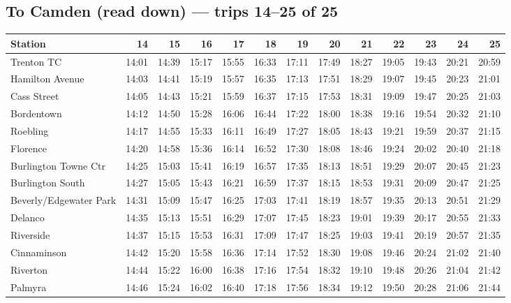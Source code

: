 \subsection*{To Camden (read down) --- trips 14--25 of 25}
\begin{center}\footnotesize\setlength{\tabcolsep}{3pt}\begin{tabular}{@{}lrrrrrrrrrrrr@{}}\toprule
Station & 14 & 15 & 16 & 17 & 18 & 19 & 20 & 21 & 22 & 23 & 24 & 25 \\\midrule
Trenton TC & 14:01 & 14:39 & 15:17 & 15:55 & 16:33 & 17:11 & 17:49 & 18:27 & 19:05 & 19:43 & 20:21 & 20:59 \\
Hamilton Avenue & 14:03 & 14:41 & 15:19 & 15:57 & 16:35 & 17:13 & 17:51 & 18:29 & 19:07 & 19:45 & 20:23 & 21:01 \\
Cass Street & 14:05 & 14:43 & 15:21 & 15:59 & 16:37 & 17:15 & 17:53 & 18:31 & 19:09 & 19:47 & 20:25 & 21:03 \\
Bordentown & 14:12 & 14:50 & 15:28 & 16:06 & 16:44 & 17:22 & 18:00 & 18:38 & 19:16 & 19:54 & 20:32 & 21:10 \\
Roebling & 14:17 & 14:55 & 15:33 & 16:11 & 16:49 & 17:27 & 18:05 & 18:43 & 19:21 & 19:59 & 20:37 & 21:15 \\
Florence & 14:20 & 14:58 & 15:36 & 16:14 & 16:52 & 17:30 & 18:08 & 18:46 & 19:24 & 20:02 & 20:40 & 21:18 \\
Burlington Towne Ctr & 14:25 & 15:03 & 15:41 & 16:19 & 16:57 & 17:35 & 18:13 & 18:51 & 19:29 & 20:07 & 20:45 & 21:23 \\
Burlington South & 14:27 & 15:05 & 15:43 & 16:21 & 16:59 & 17:37 & 18:15 & 18:53 & 19:31 & 20:09 & 20:47 & 21:25 \\
Beverly/Edgewater Park & 14:31 & 15:09 & 15:47 & 16:25 & 17:03 & 17:41 & 18:19 & 18:57 & 19:35 & 20:13 & 20:51 & 21:29 \\
Delanco & 14:35 & 15:13 & 15:51 & 16:29 & 17:07 & 17:45 & 18:23 & 19:01 & 19:39 & 20:17 & 20:55 & 21:33 \\
Riverside & 14:37 & 15:15 & 15:53 & 16:31 & 17:09 & 17:47 & 18:25 & 19:03 & 19:41 & 20:19 & 20:57 & 21:35 \\
Cinnaminson & 14:42 & 15:20 & 15:58 & 16:36 & 17:14 & 17:52 & 18:30 & 19:08 & 19:46 & 20:24 & 21:02 & 21:40 \\
Riverton & 14:44 & 15:22 & 16:00 & 16:38 & 17:16 & 17:54 & 18:32 & 19:10 & 19:48 & 20:26 & 21:04 & 21:42 \\
Palmyra & 14:46 & 15:24 & 16:02 & 16:40 & 17:18 & 17:56 & 18:34 & 19:12 & 19:50 & 20:28 & 21:06 & 21:44 \\

\end{tabular}
\end{center}
